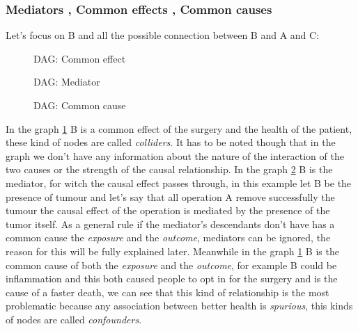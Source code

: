 \subsubsection{Mediators , Common effects , Common causes }
Let's focus on B and all the possible connection between B and A and C:
\begin{figure}[H]
\centering    
\caption{DAG: Common effect}
\label{DAG:Common effect}
\end{figure} 
\begin{figure}[H]
	\centering
\caption{DAG: Mediator}
\label{DAG:Mediator}
\end{figure} 
\begin{figure}[H]
	\centering
\caption{DAG: Common cause}
\label{DAG:Common cause}
\end{figure}
In the graph \ref{DAG:Common effect} B is a common effect of the surgery and the health of the patient, these kind of nodes are called \textit{colliders}.  It has to be noted though that in the graph we don't have any information about the nature of the interaction of the two causes or the strength of the causal relationship.
In the graph \ref{DAG:Mediator} B is the mediator, for witch the causal effect passes through, in this example let B be the presence of tumour and let's say that all operation A remove successfully the tumour the causal effect of the operation is mediated by the presence of the tumor itself. As a general rule if the mediator's descendants don't have has a common cause the \textit{exposure} and the \textit{outcome}, mediators can be ignored, the reason for this will be fully explained later.
Meanwhile in the graph \ref{DAG:Common effect} B is the common cause of both the \textit{exposure} and the \textit{outcome}, for example B could be inflammation and this both caused people to opt in for the surgery and is the cause of a faster death, we can see that this kind of relationship is the most problematic because any association between better health is \textit{spurious}, this kinds of nodes are called \textit{confounders}.

